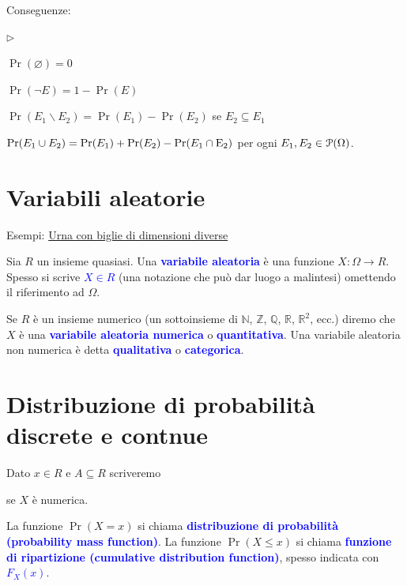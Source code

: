 \documentclass[12pt,openany]{book}
\def\RR{\mathds R}
\def\ZZ{\mathds Z}
\def\NN{\mathds N}
\def\QQ{\mathds Q}
\def\P{\EuScript P}
\def\0{\varnothing}
\def\E{{\rm E}}
\newcommand{\mylabel}[1]{{\footnotesize\textsf{#1}}\hfill}
\renewenvironment{itemize}
  {\begin{list}{$\triangleright$}{%
   \setlength{\parskip}{0mm}
   \setlength{\topsep}{.2\baselineskip}
   \setlength{\rightmargin}{0mm}
   \setlength{\listparindent}{0mm}
   \setlength{\itemindent}{0mm}
   \setlength{\labelwidth}{3ex}
   \setlength{\itemsep}{.4\baselineskip}
   \setlength{\parsep}{0mm}
   \setlength{\partopsep}{0mm}
   \setlength{\labelsep}{1ex}
   \setlength{\leftmargin}{\labelwidth+\labelsep}
   \let\makelabel\mylabel}}{%
   \end{list}\vspace*{-1.3mm}}
\def\emph#1{\textcolor{blue}{\textbf{\boldmath #1}}}
\theoremstyle{mio}
\theoremstyle{liscio}
\begin{document}
Conseguenze:


\begin{itemize}
\item $\Pr(\0)=0$
\item $\Pr(\neg E)=1-\Pr(E)$
\item $\Pr(E_1\smallsetminus E_2)=\Pr(E_1)-\Pr(E_2)$ se $E_2\subseteq E_1$
\item $\Pr(E_1\cup E_2)=\Pr(E_1)+\Pr(E_2)-\Pr(E_1\cap\E_2)$ per ogni $E_1,E_2\in\P(\Omega)$.
\end{itemize}

\hfill{}\clearpage\section{Variabili aleatorie}

{\color{brown}Esempi: \hyperref[Urna_biglie_diverse]{Urna con biglie di dimensioni diverse \faShare}}

Sia $R$ un insieme quasiasi. Una \emph{variabile aleatoria\/} è una funzione $X:\Omega\to R$. Spesso si scrive \emph{$X\in R$\/} (una notazione che può dar luogo a malintesi) omettendo il riferimento ad $\Omega$.

Se $R$ è un insieme numerico (un sottoinsieme di $\NN$, $\ZZ$, $\QQ$, $\RR$, $\RR^2$, ecc.) diremo che $X$ è una \emph{variabile aleatoria numerica\/} o \emph{quantitativa}. Una variabile aleatoria non numerica è detta \emph{qualitativa\/} o \emph{categorica}.


\hfill{}\clearpage\section{Distribuzione di probabilità discrete e contnue}

Dato $x\in R$ e $A\subseteq R$ scriveremo

\ceq{\hfill \emph{$p_x$}\medrel{=}\emph{$\Pr(X=x)$}}{=}{\Pr\big(\{\omega\in\Omega\ :\ X(\omega)=x\}\big)}

\ceq{\hfill \emph{$\Pr(X\in A)$}}{=}{\Pr\big(\{\omega\in\Omega\ :\ X(\omega)\in A\}\big)}

\ceq{\hfill \emph{$F_X(x)$}\medrel{=}\emph{$\Pr(X \le x$)}}{=}{\Pr\big(\{\omega\in\Omega\ :\ X(\omega)\le x\}\big)}\hfill  se $X$ \`e numerica.

La funzione $\Pr(X=x)$ si chiama \emph{distribuzione di probabilità (probability mass function)}. La funzione $\Pr(X \le x)$ si chiama  \emph{funzione di ripartizione (cumulative distribution function)}, spesso indicata con \emph{$F_X(x)$}.
\end{document}
